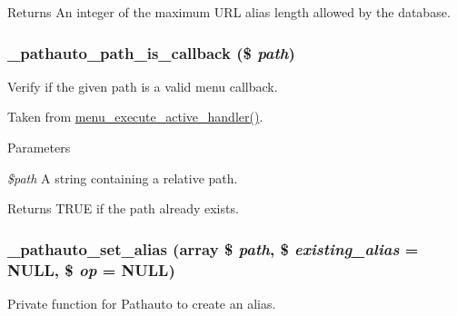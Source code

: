 \begin{DoxyReturn}{Returns}
An integer of the maximum URL alias length allowed by the database. 
\end{DoxyReturn}
\hypertarget{pathauto_8inc_a37f91c1fb2698d7280300505d2dcd55e}{
\subsubsection[{\_\-pathauto\_\-path\_\-is\_\-callback}]{\setlength{\rightskip}{0pt plus 5cm}\_\-pathauto\_\-path\_\-is\_\-callback (\$ {\em path})}}
\label{pathauto_8inc_a37f91c1fb2698d7280300505d2dcd55e}
Verify if the given path is a valid menu callback.

Taken from \hyperlink{group__menu_gae33bae24fcac6126aa272d1c437f947c}{menu\_\-execute\_\-active\_\-handler()}.


\begin{DoxyParams}{Parameters}
\item[{\em \$path}]A string containing a relative path. \end{DoxyParams}
\begin{DoxyReturn}{Returns}
TRUE if the path already exists. 
\end{DoxyReturn}
\hypertarget{pathauto_8inc_a954e5a5c442176c91e5a8fead004f9f1}{
\subsubsection[{\_\-pathauto\_\-set\_\-alias}]{\setlength{\rightskip}{0pt plus 5cm}\_\-pathauto\_\-set\_\-alias (array \$ {\em path}, \/  \$ {\em existing\_\-alias} = {\ttfamily NULL}, \/  \$ {\em op} = {\ttfamily NULL})}}
\label{pathauto_8inc_a954e5a5c442176c91e5a8fead004f9f1}
Private function for Pathauto to create an alias.


